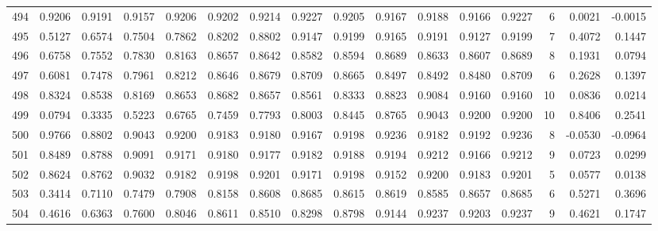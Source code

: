 \begin{tabular}{lrrrrrrrrrrrrrrr}
494 &      0.9206 &  0.9191 &  0.9157 &  0.9206 &  0.9202 &  0.9214 &  0.9227 &  0.9205 &  0.9167 &  0.9188 &   0.9166 &     0.9227 &      6 &                    0.0021 &                    -0.0015 \\
495 &      0.5127 &  0.6574 &  0.7504 &  0.7862 &  0.8202 &  0.8802 &  0.9147 &  0.9199 &  0.9165 &  0.9191 &   0.9127 &     0.9199 &      7 &                    0.4072 &                     0.1447 \\
496 &      0.6758 &  0.7552 &  0.7830 &  0.8163 &  0.8657 &  0.8642 &  0.8582 &  0.8594 &  0.8689 &  0.8633 &   0.8607 &     0.8689 &      8 &                    0.1931 &                     0.0794 \\
497 &      0.6081 &  0.7478 &  0.7961 &  0.8212 &  0.8646 &  0.8679 &  0.8709 &  0.8665 &  0.8497 &  0.8492 &   0.8480 &     0.8709 &      6 &                    0.2628 &                     0.1397 \\
498 &      0.8324 &  0.8538 &  0.8169 &  0.8653 &  0.8682 &  0.8657 &  0.8561 &  0.8333 &  0.8823 &  0.9084 &   0.9160 &     0.9160 &     10 &                    0.0836 &                     0.0214 \\
499 &      0.0794 &  0.3335 &  0.5223 &  0.6765 &  0.7459 &  0.7793 &  0.8003 &  0.8445 &  0.8765 &  0.9043 &   0.9200 &     0.9200 &     10 &                    0.8406 &                     0.2541 \\
500 &      0.9766 &  0.8802 &  0.9043 &  0.9200 &  0.9183 &  0.9180 &  0.9167 &  0.9198 &  0.9236 &  0.9182 &   0.9192 &     0.9236 &      8 &                   -0.0530 &                    -0.0964 \\
501 &      0.8489 &  0.8788 &  0.9091 &  0.9171 &  0.9180 &  0.9177 &  0.9182 &  0.9188 &  0.9194 &  0.9212 &   0.9166 &     0.9212 &      9 &                    0.0723 &                     0.0299 \\
502 &      0.8624 &  0.8762 &  0.9032 &  0.9182 &  0.9198 &  0.9201 &  0.9171 &  0.9198 &  0.9152 &  0.9200 &   0.9183 &     0.9201 &      5 &                    0.0577 &                     0.0138 \\
503 &      0.3414 &  0.7110 &  0.7479 &  0.7908 &  0.8158 &  0.8608 &  0.8685 &  0.8615 &  0.8619 &  0.8585 &   0.8657 &     0.8685 &      6 &                    0.5271 &                     0.3696 \\
504 &      0.4616 &  0.6363 &  0.7600 &  0.8046 &  0.8611 &  0.8510 &  0.8298 &  0.8798 &  0.9144 &  0.9237 &   0.9203 &     0.9237 &      9 &                    0.4621 &                     0.1747 \\

\end{tabular}
